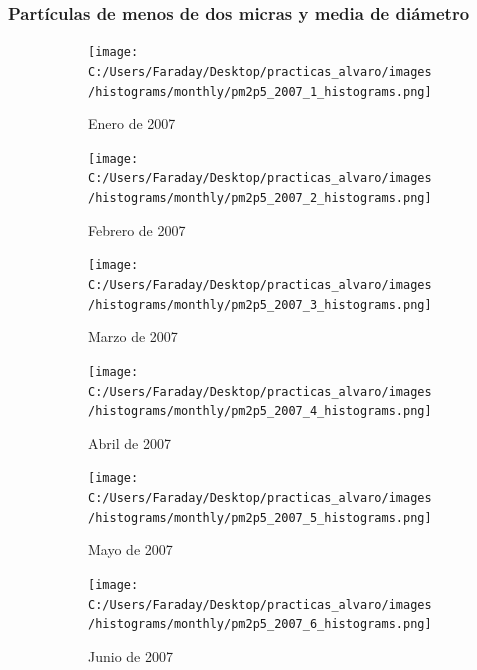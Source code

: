 \documentclass[12pt]{article}
\begin{document}
\newpage

\subsubsection*{Partículas de menos de dos micras y media de diámetro}
%

\begin{figure}[H]
\centering
\begin{subfigure}[h]{0.45\textwidth}
\texttt{[image: C:/Users/Faraday/Desktop/practicas\_alvaro/images/histograms/monthly/pm2p5\_2007\_1\_histograms.png]}
\caption{Enero de 2007}
\label{fig:hist-mon-4-1-2007}
\end{subfigure}
%
\begin{subfigure}[H]{0.45\textwidth}
\texttt{[image: C:/Users/Faraday/Desktop/practicas\_alvaro/images/histograms/monthly/pm2p5\_2007\_2\_histograms.png]}
\caption{Febrero de 2007}
\label{fig:hist-mon-4-2-2007}
\end{subfigure}
\caption{}
\end{figure}

\begin{figure}[H]
\centering
\begin{subfigure}[h]{0.45\textwidth}
\texttt{[image: C:/Users/Faraday/Desktop/practicas\_alvaro/images/histograms/monthly/pm2p5\_2007\_3\_histograms.png]}
\caption{Marzo de 2007}
\label{fig:hist-mon-4-3-2007}
\end{subfigure}
%
\begin{subfigure}[H]{0.45\textwidth}
\texttt{[image: C:/Users/Faraday/Desktop/practicas\_alvaro/images/histograms/monthly/pm2p5\_2007\_4\_histograms.png]}
\caption{Abril de 2007}
\label{fig:hist-mon-4-4-2007}
\end{subfigure}
\caption{}
\end{figure}

\begin{figure}[H]
\centering
\begin{subfigure}[h]{0.45\textwidth}
\texttt{[image: C:/Users/Faraday/Desktop/practicas\_alvaro/images/histograms/monthly/pm2p5\_2007\_5\_histograms.png]}
\caption{Mayo de 2007}
\label{fig:hist-mon-4-5-2007}
\end{subfigure}
%
\begin{subfigure}[H]{0.45\textwidth}
\texttt{[image: C:/Users/Faraday/Desktop/practicas\_alvaro/images/histograms/monthly/pm2p5\_2007\_6\_histograms.png]}
\caption{Junio de 2007}
\label{fig:hist-mon-4-6-2007}
\end{subfigure}
\caption{}
\end{figure}
\end{document}

